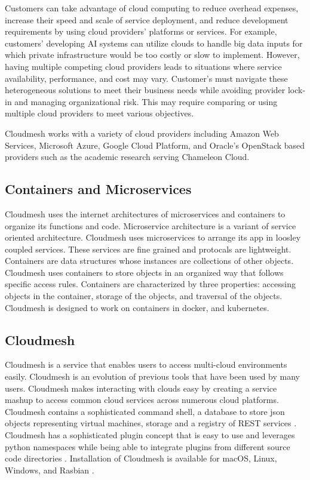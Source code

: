 Customers can take advantage of cloud computing to reduce overhead
expenses, increase their speed and scale of service deployment, and
reduce development requirements by using cloud providers' platforms or
services. For example, customers' developing AI systems can utilize
clouds to handle big data inputs for which private infrastructure would
be too costly or slow to implement. However, having multiple competing
cloud providers leads to situations where service availability,
performance, and cost may vary. Customer's must navigate these
heterogeneous solutions to meet their business needs while avoiding
provider lock-in and managing organizational risk. This may require
comparing or using multiple cloud providers to meet various objectives.

Cloudmesh works with a variety of cloud providers including Amazon Web
Services, Microsoft Azure, Google Cloud Platform, and Oracle's OpenStack
based providers such as the academic research serving Chameleon Cloud.

\subsection{Containers and Microservices}
\label{containers-and-microservices}

Cloudmesh uses the internet architectures of microservices and
containers to organize its functions and code. Microservice architecture
is a variant of service oriented architecture. Cloudmesh uses
microservices to arrange its app in loosley coupled services. These
services are fine grained and protocals are lightweight. Containers are
data structures whose instances are collections of other objects.
Cloudmesh uses containers to store objects in an organized way that
follows specific access rules. Containers are characterized by three
properties: accessing objects in the container, storage of the objects,
and traversal of the objects. Cloudmesh is designed to work on
containers in docker, and kubernetes.


\subsection{Cloudmesh}\label{cloudmesh}

Cloudmesh \cite{cloudmesh-manual} is a service that enables users to
access multi-cloud environments easily. Cloudmesh is an evolution of
previous tools that have been used by many users. Cloudmesh makes
interacting with clouds easy by creating a service mashup to access
common cloud services across numerous cloud platforms. Cloudmesh
contains a sophisticated command shell, a database to store json
objects representing virtual machines, storage and a registry of REST
services \cite{cloudmesh-openapi}.  Cloudmesh has a sophisticated
plugin concept that is easy to use and leverages python namespaces
while being able to integrate plugins from different source code
directories \cite{cloudmesh-github}.  Installation of Cloudmesh is
available for macOS, Linux, Windows, and Rasbian
\cite{cloudmesh-manual}.




